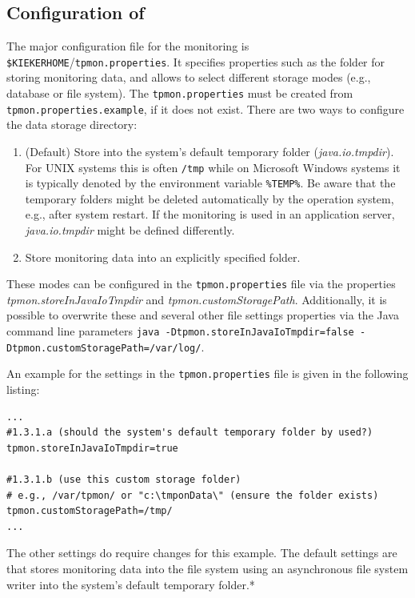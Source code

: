 \documentclass[a4paper,12pt]{scrartcl}
\begin{document}
\subsection{Configuration of \tpmon{}}
The major configuration file for the monitoring is \texttt{\$KIEKERHOME}/\texttt{tpmon.properties}. It specifies properties such as the folder for storing monitoring data, and allows to select different storage modes (e.g., database or file system). The \texttt{tpmon.properties} must be created from \texttt{tpmon.properties.example}, if it does not exist. There are two ways to configure the data storage directory:
\begin{enumerate}
\item (Default) Store into the system's default temporary folder (\textit{java.io.tmpdir}). For UNIX systems this is often \texttt{/tmp} while on Microsoft Windows systems it is typically %
denoted by the environment variable \texttt{\%TEMP\%}. Be aware that the temporary folders might be deleted automatically by the operation system, e.g., after system restart. If the monitoring is used in an application server, \textit{java.io.tmpdir} might be defined differently.
\item Store monitoring data into an explicitly specified folder.
\end{enumerate}
These modes can be configured in the \texttt{tpmon.properties} file via the properties \linebreak[4] \textit{tpmon.storeInJavaIoTmpdir} and \textit{tpmon.customStoragePath}. Additionally, it is possible to overwrite these and several other file settings properties via the Java command line parameters {\footnotesize \texttt{java -Dtpmon.storeInJavaIoTmpdir=false -Dtpmon.customStoragePath=/var/log/}}.

An example for the settings in the \texttt{tpmon.properties} file is given in the following listing:
\begin{lstlisting}[caption={Linux/Unix: Specification of the monitoring data storage location}]
...
#1.3.1.a (should the system's default temporary folder by used?)
tpmon.storeInJavaIoTmpdir=true

#1.3.1.b (use this custom storage folder)
# e.g., /var/tpmon/ or "c:\tmponData\" (ensure the folder exists)
tpmon.customStoragePath=/tmp/
...
\end{lstlisting}

The other settings do require changes for this example. The default settings are that \tpmon{} stores monitoring data into the file system using an asynchronous file system writer into the system's default temporary folder.*
\end{document}
